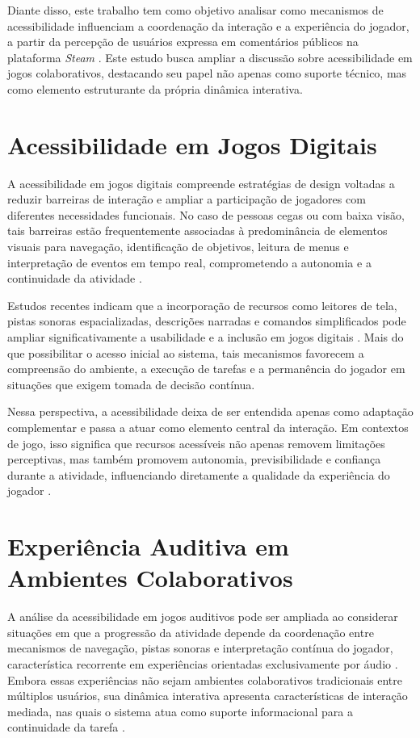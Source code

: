 \documentclass[12pt]{article}
\begin{document}
{{Diante disso, este trabalho tem como objetivo analisar como mecanismos de acessibilidade influenciam a coordenação da interação e a experiência do jogador, a partir da percepção de usuários expressa em comentários públicos na plataforma \textit{Steam} \cite{SteamPlatform}. Este estudo busca ampliar a discussão sobre acessibilidade em jogos colaborativos, destacando seu papel não apenas como suporte técnico, mas como elemento estruturante da própria dinâmica interativa.

\section{Acessibilidade em Jogos Digitais}
A acessibilidade em jogos digitais compreende estratégias de design voltadas a reduzir barreiras de interação e ampliar a participação de jogadores com diferentes necessidades funcionais. No caso de pessoas cegas ou com baixa visão, tais barreiras estão frequentemente associadas à predominância de elementos visuais para navegação, identificação de objetivos, leitura de menus e interpretação de eventos em tempo real, comprometendo a autonomia e a continuidade da atividade \cite{10.1007/s10209-010-0189-5}.

Estudos recentes indicam que a incorporação de recursos como leitores de tela, pistas sonoras espacializadas, descrições narradas e comandos simplificados pode ampliar significativamente a usabilidade e a inclusão em jogos digitais \cite{aguado2020accessibility}. Mais do que possibilitar o acesso inicial ao sistema, tais mecanismos favorecem a compreensão do ambiente, a execução de tarefas e a permanência do jogador em situações que exigem tomada de decisão contínua.

Nessa perspectiva, a acessibilidade deixa de ser entendida apenas como adaptação complementar e passa a atuar como elemento central da interação. Em contextos de jogo, isso significa que recursos acessíveis não apenas removem limitações perceptivas, mas também promovem autonomia, previsibilidade e confiança durante a atividade, influenciando diretamente a qualidade da experiência do jogador \cite{holloway2019disability}.

\section{Experiência Auditiva em Ambientes Colaborativos}

A análise da acessibilidade em jogos auditivos pode ser ampliada ao considerar situações em que a progressão da atividade depende da coordenação entre mecanismos de navegação, pistas sonoras e interpretação contínua do jogador, característica recorrente em experiências orientadas exclusivamente por áudio \cite{10.1145/1067343.1067361}. Embora essas experiências não sejam ambientes colaborativos tradicionais entre múltiplos usuários, sua dinâmica interativa apresenta características de interação mediada, nas quais o sistema atua como suporte informacional para a continuidade da tarefa \cite{BANNON1995205}.

}}
\end{document}
